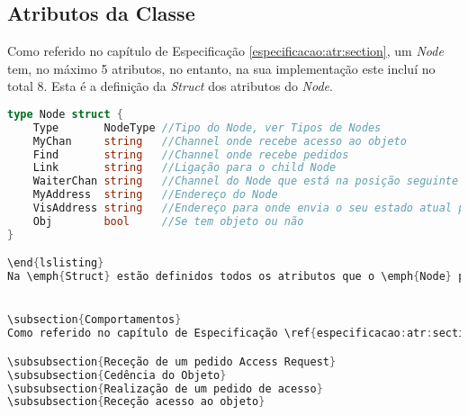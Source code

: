 \subsection{Atributos da Classe}
Como referido no capítulo de Especificação \ref{especificacao:atr:section}, um \emph{Node} tem, no máximo 5 atributos, no entanto, na sua implementação este incluí no total 8.
Esta é a definição da \emph{Struct} dos atributos do \emph{Node}.


\begin{lstlisting}[caption={Definição da estrutura \emph{Node}},language=Go]
type Node struct {
	Type       NodeType //Tipo do Node, ver Tipos de Nodes
	MyChan     string   //Channel onde recebe acesso ao objeto
	Find       string   //Channel onde recebe pedidos
	Link       string   //Ligação para o child Node
	WaiterChan string   //Channel do Node que está na posição seguinte da fila
	MyAddress  string   //Endereço do Node
	VisAddress string   //Endereço para onde envia o seu estado atual para a atualização da visualização
	Obj        bool     //Se tem objeto ou não 
}

\end{lslisting}
Na \emph{Struct} estão definidos todos os atributos que o \emph{Node} pode deter, porém, quando um atributo é ``inexistente'', este é definido como vazio, ou seja, os atributos ``WaiterChan'', ``VisAddress'' e ``Link'' podem ser \emph{strings} vazias.


\subsection{Comportamentos}
Como referido no capítulo de Especificação \ref{especificacao:atr:section},

\subsubsection{Receção de um pedido Access Request}
\subsubsection{Cedência do Objeto}
\subsubsection{Realização de um pedido de acesso}
\subsubsection{Receção acesso ao objeto}


\end{lstlisting}
